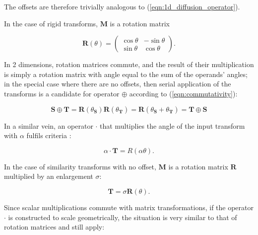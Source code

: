 		The offsets are therefore trivially analogous to (\ref{eqn:1d_diffusion_operator}).
		
		In the case of rigid transforms, $\mathbf{M}$ is a rotation matrix
		
		\begin{equation}
			\mathbf{R}(\theta) = \left( \begin{matrix}
			  										 \cos \theta & -\sin\theta \\
														 \sin\theta & \cos\theta
					                 \end{matrix} \right) .
		\end{equation}
		
		In 2 dimensions, rotation matrices commute, and the result of their multiplication is simply a rotation matrix with angle equal to the sum of the operands' angles; in the special case where there are no offsets, then serial application of the transforms is a candidate for operator $\oplus$ according to (\ref{eqn:commutativity}):
		
		\begin{equation}
			\mathbf{S} \oplus \mathbf{T} = \mathbf{R}(\theta_\mathbf{S})\mathbf{R}(\theta_\mathbf{T}) = \mathbf{R}(\theta_\mathbf{S} + \theta_\mathbf{T}) = \mathbf{T} \oplus \mathbf{S}
		\end{equation}
		
		
		In a similar vein, an operator $\cdot$ that multiplies the angle of the input transform with $\alpha$ fulfils criteria :
    
    \begin{equation}
      \alpha \cdot \mathbf{T} = R(\alpha\theta).
    \end{equation}
		
        In the case of similarity transforms with no offset, $\mathbf{M}$ is a rotation matrix $\mathbf{R}$ multiplied by an enlargement $\sigma$:
        
        \begin{equation}
            \mathbf{T} = \sigma\mathbf{R}(\theta).
        \end{equation}
        
        Since scalar multiplications commute with matrix transformations, if the operator $\cdot$ is constructed to scale geometrically, the situation is very similar to that of rotation matrices and  still apply:
        
